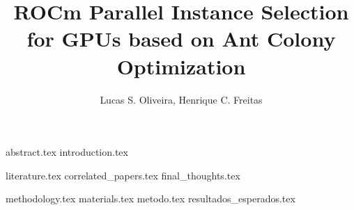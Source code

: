 \documentclass{article}
\title{ROCm Parallel Instance Selection for GPUs based on Ant Colony Optimization}
\author{{Lucas S. Oliveira\inst{1}, Henrique C. Freitas\inst{1}}}
\begin{document}
\maketitle

{abstract.tex}
{introduction.tex}

{literature.tex}
{correlated_papers.tex}
{final_thoughts.tex}

{methodology.tex}
{materials.tex}
{metodo.tex}
{resultados_esperados.tex}

\printbibliography
\end{document}
